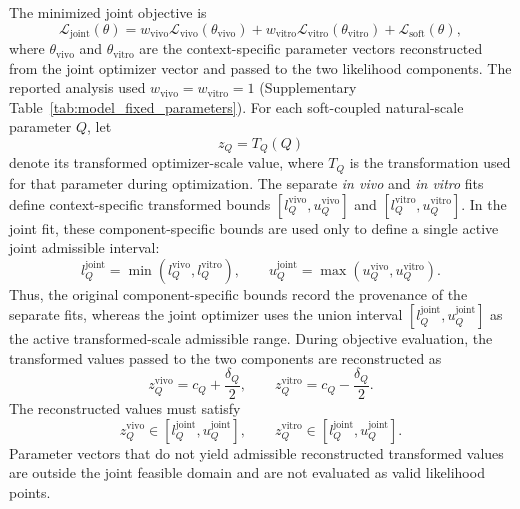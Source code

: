 \documentclass[11pt]{article}
\begin{document}
The minimized joint objective is
\begin{equation}
\mathcal L_{\mathrm{joint}}(\theta) = w_{\mathrm{vivo}}\mathcal L_{\mathrm{vivo}}(\theta_{\mathrm{vivo}}) + w_{\mathrm{vitro}}\mathcal L_{\mathrm{vitro}}(\theta_{\mathrm{vitro}}) + \mathcal L_{\mathrm{soft}}(\theta),
\label{eq:appendix_joint_objective}
\end{equation}
where $\theta_{\mathrm{vivo}}$ and $\theta_{\mathrm{vitro}}$ are the context-specific parameter vectors reconstructed from the joint optimizer vector and passed to the two likelihood components.
The reported analysis used $w_{\mathrm{vivo}}=w_{\mathrm{vitro}}=1$ (Supplementary Table~\ref{tab:model_fixed_parameters}).
For each soft-coupled natural-scale parameter $Q$, let
\[
z_Q=T_Q(Q)
\]
denote its transformed optimizer-scale value, where $T_Q$ is the transformation used for that parameter during optimization. The separate \textit{in vivo} and \textit{in vitro} fits define context-specific transformed bounds $[l_Q^{\mathrm{vivo}},u_Q^{\mathrm{vivo}}]$ and $[l_Q^{\mathrm{vitro}},u_Q^{\mathrm{vitro}}]$. In the joint fit, these component-specific bounds are used only to define a single active joint admissible interval:
\begin{equation}
l_Q^{\mathrm{joint}} = \min\!\left(l_Q^{\mathrm{vivo}},l_Q^{\mathrm{vitro}}\right), \qquad u_Q^{\mathrm{joint}} = \max\!\left(u_Q^{\mathrm{vivo}},u_Q^{\mathrm{vitro}}\right).
\label{eq:appendix_joint_union_bounds}
\end{equation}
Thus, the original component-specific bounds record the provenance of the separate fits, whereas the joint optimizer uses the union interval $[l_Q^{\mathrm{joint}},u_Q^{\mathrm{joint}}]$ as the active transformed-scale admissible range.
During objective evaluation, the transformed values passed to the two components are reconstructed as
\begin{equation}
z^{\mathrm{vivo}}_Q = c_Q+\frac{\delta_Q}{2}, \qquad z^{\mathrm{vitro}}_Q = c_Q-\frac{\delta_Q}{2}.
\label{eq:appendix_joint_center_delta_split}
\end{equation}
The reconstructed values must satisfy
\begin{equation}
z_Q^{\mathrm{vivo}}\in [l_Q^{\mathrm{joint}},u_Q^{\mathrm{joint}}], \qquad z_Q^{\mathrm{vitro}}\in [l_Q^{\mathrm{joint}},u_Q^{\mathrm{joint}}].
\label{eq:appendix_joint_reconstructed_bounds}
\end{equation}
Parameter vectors that do not yield admissible reconstructed transformed values are outside the joint feasible domain and are not evaluated as valid likelihood points.
\end{document}
